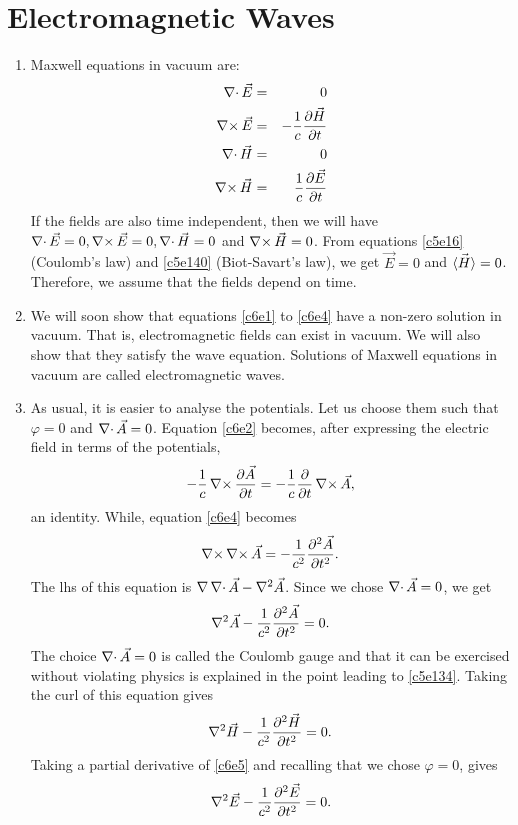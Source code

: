 \chapter{Electromagnetic Waves}\label{c6}
\begin{enumerate}
\item Maxwell equations in vacuum are:
\begin{eqnarray}
\operatorname{\nabla\cdot}\vec{E} &=& 0 \label{c6e1} \\
\operatorname{\nabla\times}\vec{E} &=& -\frac{1}{c}\frac{\partial{\vec{H}}}{\partial{t}} \label{c6e2} \\
\operatorname{\nabla\cdot}\vec{H} &=& 0 \label{c6e3} \\
\operatorname{\nabla\times}\vec{H} &=& \frac{1}{c}\frac{\partial{\vec{E}}}{\partial{t}} \label{c6e4}
\end{eqnarray}
If the fields are also time independent, then we will have $\operatorname{\nabla\cdot}\vec{E} = 0,
\operatorname{\nabla\times}\vec{E} = 0, \operatorname{\nabla\cdot}\vec{H} = 0$ and $\operatorname{\nabla\times}\vec{H} = 0$. From equations
\eqref{c5e16} (Coulomb's law) and \eqref{c5e140} (Biot-Savart's law), we get
$\vec{E} = 0$ and $\vec{\left\langle{H}\right\rangle} = 0$. Therefore, we assume that the fields depend
on time.

\item We will soon show that equations \eqref{c6e1} to \eqref{c6e4} have a
non-zero solution in vacuum. That is, electromagnetic fields can exist in vacuum.
We will also show that they satisfy the wave equation. Solutions of Maxwell
equations in vacuum are called electromagnetic waves.

\item As usual, it is easier to analyse the potentials. Let us choose them such
that $\varphi = 0$ and $\operatorname{\nabla\cdot}\vec{A} = 0$. Equation \eqref{c6e2} becomes, after
expressing the electric field in terms of the potentials,
\[
-\frac{1}{c}\operatorname{\nabla\times}\frac{\partial{\vec{A}}}{\partial{t}} = 
-\frac{1}{c}\frac{\partial}{\partial t}\operatorname{\nabla\times}\vec{A},
\]
an identity. While, equation \eqref{c6e4} becomes
\[
\operatorname{\nabla\times}\operatorname{\nabla\times}\vec{A} = -\frac{1}{c^2}\frac{\partial^2{\vec{A}}}{\partial{t}^2}.
\]
The lhs of this equation is $\operatorname{\nabla}\operatorname{\nabla\cdot}\vec{A} - \nabla^2\vec{A}$. Since we chose
$\operatorname{\nabla\cdot}{\vec{A}} = 0$, we get
\begin{equation}\label{c6e5}
\nabla^2\vec{A} - \frac{1}{c^2}\frac{\partial^2{\vec{A}}}{\partial{t}^2} = 0.
\end{equation}
The choice $\operatorname{\nabla\cdot}{\vec{A}} = 0$ is called the Coulomb gauge and that it can be
exercised without violating physics is explained in the point leading to 
\eqref{c5e134}. Taking the curl of this equation gives
\begin{equation}\label{c6e6}
\nabla^2\vec{H} - \frac{1}{c^2}\frac{\partial^2{\vec{H}}}{\partial{t}^2} = 0.
\end{equation}
Taking a partial derivative of \eqref{c6e5} and recalling that we chose $\varphi
= 0$, gives
\begin{equation}\label{c6e7}
\nabla^2\vec{E} - \frac{1}{c^2}\frac{\partial^2{\vec{E}}}{\partial{t}^2} = 0.
\end{equation}


\end{enumerate}

